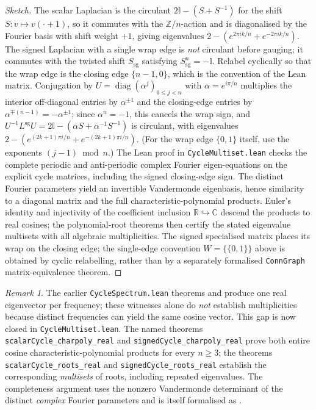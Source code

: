 \documentclass[11pt,a4paper]{amsart}
\theoremstyle{plain}
\theoremstyle{definition}
\theoremstyle{remark}
\newtheorem{remark}[theorem]{Remark}
\DeclareMathOperator{\diag}{diag}
\newcommand{\RR}{\mathbb{R}}
\newcommand{\ZZ}{\mathbb{Z}}
\newcommand{\II}{\mathbb{I}}
\newcommand{\CC}{\mathbb{C}}
\newcommand{\Lsigned}{L^{\operatorname{sg}}}
\begin{document}
\begin{proof}[Sketch]
The scalar Laplacian is the circulant $2\II - (S+S^{-1})$ for the
shift $S:v\mapsto v(\cdot+1)$, so it commutes with the $\ZZ/n$-action
and is diagonalised by the Fourier basis with shift weight $+1$,
giving eigenvalues $2 - (e^{2\pi i k/n}+e^{-2\pi ik/n})$. The signed
Laplacian with a single wrap edge is \emph{not} circulant before
gauging; it commutes with the twisted shift $S_{\mathrm{sg}}$
satisfying $S_{\mathrm{sg}}^n=-\II$. Relabel cyclically so that the
wrap edge is the closing edge $\{n-1,0\}$, which is the convention of
the Lean matrix. Conjugation by $U=\diag(\alpha^j)_{0\le j<n}$ with
$\alpha=e^{i\pi/n}$ multiplies the interior off-diagonal entries by
$\alpha^{\pm1}$ and the closing-edge entries by
$\alpha^{\mp(n-1)}=-\alpha^{\pm1}$; since $\alpha^n=-1$, this cancels
the wrap sign, and $U^{-1}\Lsigned U = 2\II-(\alpha S+\alpha^{-1}S^{-1})$
is circulant, with eigenvalues
$2 - (e^{(2k+1)\pi i/n}+e^{-(2k+1)\pi i/n})$. (For the wrap edge
$\{0,1\}$ itself, use the exponents $(j-1)\bmod n$.)
The Lean proof in \texttt{CycleMultiset.lean} checks the complete
periodic and anti-periodic complex Fourier eigen-equations on the
explicit cycle matrices, including the signed closing-edge sign.
The distinct Fourier parameters yield an invertible Vandermonde
eigenbasis, hence similarity to a diagonal matrix and the full
characteristic-polynomial products. Euler's identity and injectivity
of the coefficient inclusion $\RR\hookrightarrow\CC$ descend the
products to real cosines; the polynomial-root theorems then certify
the stated eigenvalue multisets with all algebraic multiplicities.
The signed specialised matrix places its wrap on the closing edge;
the single-edge convention $W=\{\{0,1\}\}$ above is obtained by
cyclic relabelling, rather than by a separately formalised
\texttt{ConnGraph} matrix-equivalence theorem.
\end{proof}

\begin{remark}\label{rem:cycle-spectrum-lean}
The earlier \texttt{CycleSpectrum.lean} theorems
 and 
produce one real eigenvector per frequency; these witnesses alone do
\emph{not} establish multiplicities because distinct frequencies can
yield the same cosine vector. This gap is now closed in
\texttt{CycleMultiset.lean}. The named theorems
\texttt{scalarCycle\_charpoly\_real} and
\texttt{signedCycle\_charpoly\_real} prove both entire cosine
characteristic-polynomial products for every $n\ge3$; the theorems
\texttt{scalarCycle\_roots\_real} and
\texttt{signedCycle\_roots\_real} establish the corresponding
\emph{multisets} of roots, including repeated eigenvalues. The
completeness argument uses the nonzero Vandermonde determinant of the
distinct \emph{complex} Fourier parameters and is itself formalised
as .
\end{remark}
\end{document}
